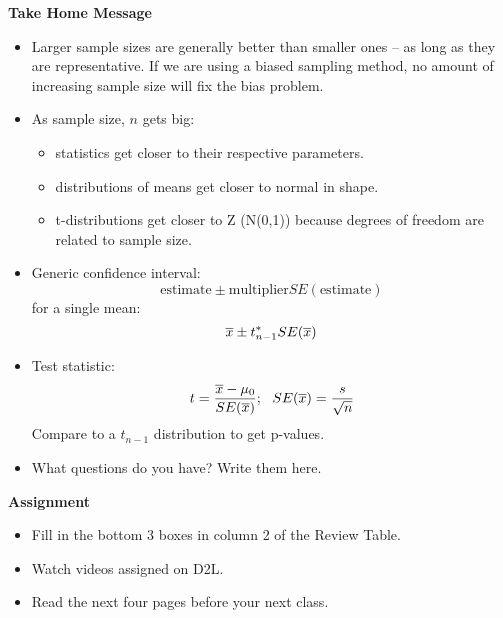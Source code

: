 \begin{center}
  {\large\bf Take Home Message}
\end{center}
 
\begin{itemize}
\item Larger sample sizes are generally better than smaller ones --
   as long as they are representative.  If we are using a biased
   sampling method, no amount of increasing sample size will fix the
   bias problem.
 \item As sample size, $n$ gets big:
   \begin{itemize}
   \item statistics get closer to their respective parameters.
   \item distributions of means get closer to normal in shape.
   \item t-distributions get closer to Z (N(0,1)) because degrees of
     freedom are related to sample size.
   \end{itemize}
 \item Generic confidence interval:
  $$ \mbox{estimate} \pm \mbox{multiplier} SE(\mbox{estimate})$$
    for a single mean:
  $$ \overline{x} \pm t^*_{n-1} SE(\overline{x})$$
  \item Test statistic:
   $$ t = \frac{\overline{x} - \mu_0}{SE(\overline{x})};\ \ SE(\overline{x}) =
   \frac{s}{\sqrt{n}}$$
    Compare to a $t_{n-1}$ distribution to get p-values.

 \item What questions do you have?  Write them here.\vfill

\end{itemize}




\begin{center}
  {\large\bf Assignment}
\end{center}

\begin{itemize}
\item Fill in the bottom 3 boxes in column 2 of the Review Table. 
\item Watch videos assigned on D2L.
\item Read the next four pages before your next class.
\end{itemize}
